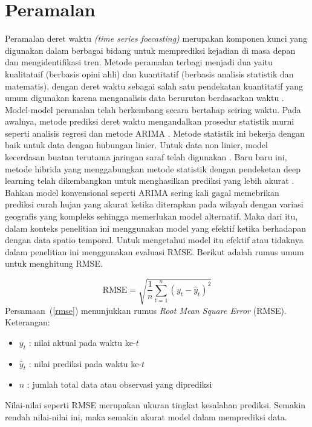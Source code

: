 \section{Peramalan}
Peramalan deret waktu \textit{(time series foecasting)} merupakan komponen kunci yang digunakan dalam berbagai bidang untuk memprediksi kejadian di masa depan dan mengidentifikasi tren. 
Metode peramalan terbagi menjadi dua yaitu kualitataif (berbasis opini ahli) dan kuantitatif (berbasis analisis statistik dan matematis), dengan deret waktu sebagai salah satu pendekatan kuantitatif yang umum digunakan karena menganalisis data berurutan berdasarkan waktu \citep{petropoulos2021forecasting}. 
Model-model peramalan telah berkembang secara bertahap seiring waktu. 
Pada awalnya, metode prediksi deret waktu mengandalkan prosedur statistik murni seperti analisis regresi dan metode ARIMA \citep{putra2019sugar}. 
Metode statistik ini bekerja dengan baik untuk data dengan hubungan linier. 
Untuk data non linier, model kecerdasan buatan terutama jaringan saraf telah digunakan \citep{marino2016building}. 
Baru baru ini, metode hibrida yang menggabungkan metode statistik dengan pendeketan deep learning telah dikembangkan untuk menghasilkan prediksi yang lebih akurat \citep{jagtap2019rainfall}. 
Bahkan model konvensional seperti ARIMA sering kali gagal memebrikan prediksi curah hujan yang akurat ketika diterapkan pada wilayah dengan variasi geografis yang kompleks sehingga memerlukan model alternatif. 
Maka dari itu, dalam konteks penelitian ini menggunakan model yang efektif ketika berhadapan dengan data spatio temporal. 
Untuk mengetahui model itu efektif atau tidaknya dalam penelitian ini menggunakan evaluasi RMSE. 
Berikut adalah rumus umum untuk menghitung RMSE.

\begin{equation}\label{rmse}
    \text{RMSE} = \sqrt{ \frac{1}{n} \sum_{t=1}^{n} (y_t - \hat{y}_t)^2 }
\end{equation}
Persamaan~(\ref{rmse}) menunjukkan rumus \textit{Root Mean Square Error} (RMSE).
Keterangan:
\begin{itemize}
  \item $y_t$ : nilai aktual pada waktu ke-$t$
  \item $\hat{y}_t$ : nilai prediksi pada waktu ke-$t$
  \item $n$ : jumlah total data atau observasi yang diprediksi
\end{itemize}
Nilai-nilai seperti RMSE merupakan ukuran tingkat kesalahan prediksi. Semakin rendah nilai-nilai ini, maka semakin akurat model dalam memprediksi data.